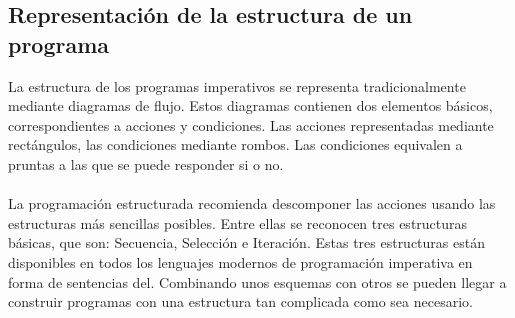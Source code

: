 \documentclass[11pt,a4paper]{article}
\begin{document}
  \subsection{Representación de la estructura de un programa}
  La estructura de los programas imperativos se representa tradicionalmente mediante diagramas de flujo. Estos diagramas 
  contienen dos elementos básicos, correspondientes a acciones y condiciones. Las acciones representadas mediante rectángulos, las condiciones mediante rombos. Las condiciones equivalen a pruntas a las que se puede responder si o no.\\
  \\
  La programación estructurada 
  recomienda descomponer las acciones usando las estructuras más sencillas posibles. Entre ellas se reconocen tres estructuras básicas, que son: Secuencia, Selección e Iteración. Estas tres estructuras están disponibles en todos los 
  lenguajes modernos de programación imperativa en forma de sentencias del. Combinando unos esquemas con otros se pueden llegar a construir 
  programas con una estructura tan complicada como sea necesario.
  
\end{document}
